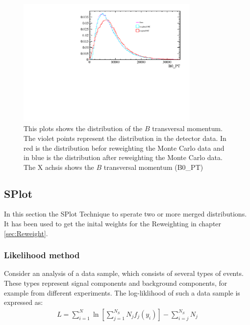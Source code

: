 \documentclass[english]{uzhpub}
\begin{document}
\begin{figure}[H]
\centering
\includegraphics[width=0.8\textwidth]{Reweighting/B0_PT}
\caption{This plots shows the distribution of the $B$ transversal momentum. The violet points represent the distribution in the detector data. In red is the distribution befor reweighting the Monte Carlo data and in blue is the distribution after reweighting the Monte Carlo data. The X achsis shows the $B$ transversal momentum (B0\_PT)}
\label{fig:B0_PT}
\end{figure}




 \subsection{SPlot}
 In this section the SPlot Technique to sperate two or more merged distributions. It has been used to get the inital weights for the Reweighting in chapter \ref{sec:Reweight}.

 \subsubsection{Likelihood method}
 Consider an analysis of a data sample, which consists of several types of events. These types represent signal components and background components, for example from different experiments. The log-liklihood of such a data sample is expressed as:
 \begin{align}
  L = \sum_{i=1}^{N} \ln \left[ \sum_{j=1}^{N_S} N_j f_j (y_i) \right] - \sum_{i=j}^{N_S} N_j \label{eq:L}
 \end{align}
\end{document}
